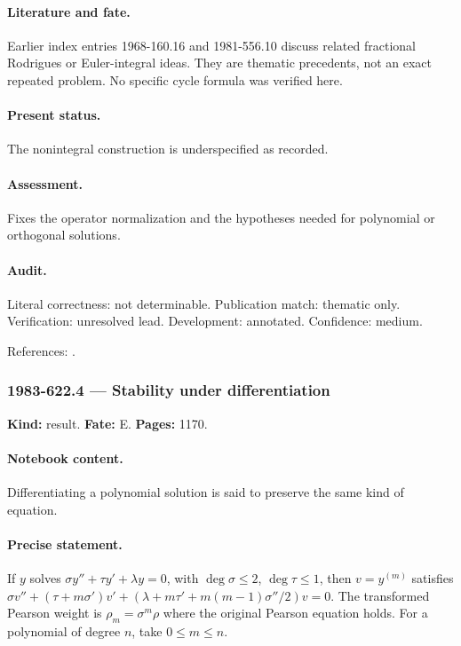 \paragraph{Literature and fate.} Earlier index entries 1968-160.16 and 1981-556.10 discuss related fractional Rodrigues or Euler-integral ideas. They are thematic precedents, not an exact repeated problem. No specific cycle formula was verified here.

\paragraph{Present status.} The nonintegral construction is underspecified as recorded.

\paragraph{Assessment.} Fixes the operator normalization and the hypotheses needed for polynomial or orthogonal solutions.

\paragraph{Audit.} Literal correctness: not determinable. Publication match: thematic only. Verification: unresolved lead. Development: annotated. Confidence: medium.

\noindent References: \citep{nikiforovsuslovuvarov1991classical}.\par

\subsubsection{1983-622.4 --- Stability under differentiation}

\label{item:1983-622.4}

\noindent\textbf{Kind:} result. \textbf{Fate:} E. \textbf{Pages:} 1170.\par

\paragraph{Notebook content.} Differentiating a polynomial solution is said to preserve the same kind of equation.

\paragraph{Precise statement.} If \(y\) solves \(\sigma y''+\tau y'+\lambda y=0\), with \(\deg\sigma\le2\), \(\deg\tau\le1\), then \(v=y^{(m)}\) satisfies \(\sigma v''+(\tau+m\sigma')v'+(\lambda+m\tau'+m(m-1)\sigma''/2)v=0\). The transformed Pearson weight is \(\rho_m=\sigma^m\rho\) where the original Pearson equation holds. For a polynomial of degree \(n\), take \(0\le m\le n\).

